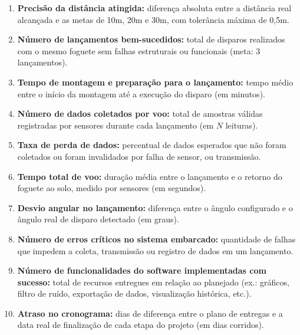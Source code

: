 \begin{enumerate}
  \item \textbf{Precisão da distância atingida:} diferença absoluta entre a distância real alcançada e as metas de 10m, 20m e 30m, com tolerância máxima de 0,5m.
  \item \textbf{Número de lançamentos bem-sucedidos:} total de disparos realizados com o mesmo foguete sem falhas estruturais ou funcionais (meta: 3 lançamentos).
  \item \textbf{Tempo de montagem e preparação para o lançamento:} tempo médio entre o início da montagem até a execução do disparo (em minutos).
  \item \textbf{Número de dados coletados por voo:} total de amostras válidas registradas por sensores durante cada lançamento (em $N$ leituras).
  \item \textbf{Taxa de perda de dados:} percentual de dados esperados que não foram coletados ou foram invalidados por falha de sensor, ou transmissão.
  \item \textbf{Tempo total de voo:} duração média entre o lançamento e o retorno do foguete ao solo, medido por sensores (em segundos).
  \item \textbf{Desvio angular no lançamento:} diferença entre o ângulo configurado e o ângulo real de disparo detectado (em graus).
  \item \textbf{Número de erros críticos no sistema embarcado:} quantidade de falhas que impedem a coleta, transmissão ou registro de dados em um lançamento.
  \item \textbf{Número de funcionalidades do software implementadas com sucesso:} total de recursos entregues em relação ao planejado (ex.: gráficos, filtro de ruído, exportação de dados, visualização histórica, etc.).
  \item \textbf{Atraso no cronograma:} dias de diferença entre o plano de entregas e a data real de finalização de cada etapa do projeto (em dias corridos).
\end{enumerate}

